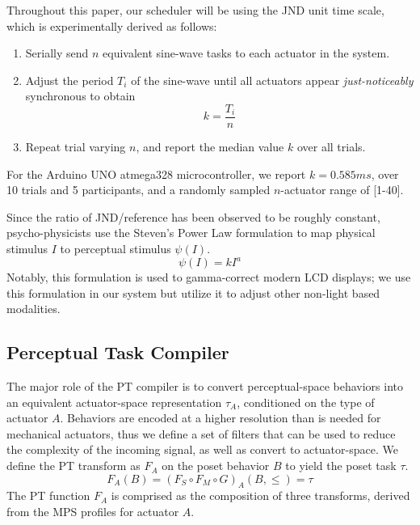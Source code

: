 \documentclass{sigchi}
\begin{document}
  Throughout this paper, our scheduler will be using the JND unit time scale, which is experimentally derived as follows: 
  \begin{enumerate} 
    \item Serially send $n$ equivalent sine-wave tasks to each actuator in the system.
    \item Adjust the period $T_i$ of the sine-wave until all actuators appear \textit{just-noticeably} synchronous to obtain 
    \begin{equation}
      k = \frac{T_i}{n}
      \label{eq:server_u}
    \end{equation}
    \item Repeat trial varying $n$, and report the median value $k$ over all trials. 
    \  
  \end{enumerate}

  For the Arduino UNO atmega328 microcontroller, we report $k = 0.585 ms$, over 10 trials and 5 participants, and a randomly sampled $n$-actuator range of [1-40]. 
  
  Since the ratio of JND/reference has been observed to be roughly constant,  psycho-physicists use the Steven's Power Law formulation to map physical stimulus $I$ to perceptual stimulus $\psi(I)$.
  \begin{equation}
    \psi(I) = kI^a
    \label{stephens_power_law}
  \end{equation}
  Notably, this formulation is used to gamma-correct modern LCD displays; we use this formulation in our system but utilize it to adjust other non-light based modalities. 
  


  \subsection{Perceptual Task Compiler}

    The major role of the PT compiler is to convert perceptual-space behaviors into an equivalent actuator-space representation $\tau_A$, conditioned on the type of actuator $A$. 
    Behaviors are encoded at a higher resolution than is needed for mechanical actuators, thus we define a set of filters that can be used to reduce the complexity of the incoming signal, as well as convert to actuator-space. We define the PT transform as $F_A$ on the poset behavior $B$ to yield the poset task $\tau$.  
    \begin{equation}
      F_A(B) = (F_S \circ F_M \circ G)_A (B, \leq) = \tau
    \end{equation}
    The PT function $F_A$ is comprised as the composition of three transforms, derived from the MPS profiles for actuator $A$. 
\end{document}
